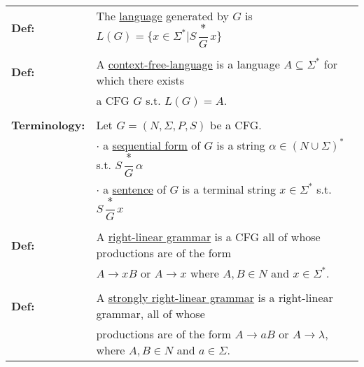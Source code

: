 \documentclass[11pt]{article}
\begin{document}
\begin{longtable}{ll}
\\
{\bf Def:} & The \underline{language} generated by $G$ is $L(G)=\{x\in\Sigma^*|S\dfrac{*}{G}x\}$ \\
\\
{\bf Def:} & A \underline{context-free-language} is a language $A\subseteq\Sigma^*$ for which there exists \\
& a CFG $G$ s.t. $L(G)=A$. \\
\\
{\bf Terminology:} & Let $G=(N,\Sigma,P,S)$ be a CFG. \\
& $\cdot$ a \underline{sequential form} of $G$ is a string $\alpha\in(N\cup\Sigma)^*$ s.t. $S\dfrac{*}{G}\alpha$ \\
& $\cdot$ a \underline{sentence} of $G$ is a terminal string $x\in\Sigma^*$ s.t. $S\dfrac{*}{G}x$ \\
\\
{\bf Def:} & A \underline{right-linear grammar} is a CFG all of whose productions are of the form \\
& $A \rightarrow xB$ or $A\rightarrow x$ where $A,B\in N$ and $x\in\Sigma^*$. \\
\\
{\bf Def:} & A \underline{strongly right-linear grammar} is a right-linear grammar, all of whose \\
& productions are of the form $A\rightarrow aB$ or $A \rightarrow\lambda$, where $A,B\in N$ and $a\in\Sigma$. 
\end{longtable}
\end{document}
